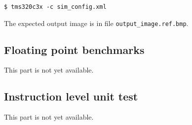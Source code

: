 \begin{verbatim}
$ tms320c3x -c sim_config.xml
\end{verbatim}

The expected output image is in file \texttt{output\_image.ref.bmp}.

\subsection{Floating point benchmarks}

This part is not yet available.

\subsection{Instruction level unit test}

This part is not yet available.
